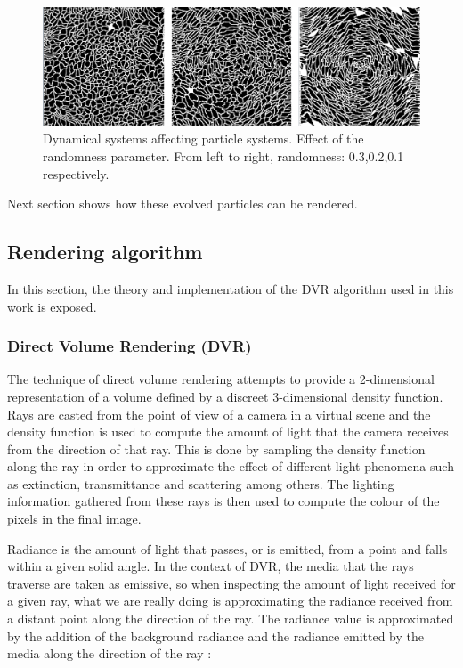 \documentclass[oneside,a4paper,english,links]{amca}
\begin{document}
\begin{figure}[htb!]
  \centerline{\includegraphics[scale=0.21]{fig4}}
  \caption{Dynamical systems affecting particle systems. Effect of the randomness parameter. From left to right, randomness: 0.3,0.2,0.1 respectively. }
  \label{fg:fig4}
\end{figure}

Next section shows how these evolved particles can be rendered.



\subsection{Rendering algorithm}

In this section, the theory and implementation of the DVR algorithm used in this work is exposed.

\subsubsection{Direct Volume Rendering (DVR)}

The technique of direct volume rendering attempts to provide a
2-dimensional representation of a volume defined by a discreet
3-dimensional density function. Rays are casted from the point of view
of a camera in a virtual scene and the density function is used to
compute the amount of light that the camera receives from the
direction of that ray. This is done by sampling the density function
along the ray in order to approximate the effect of different light
phenomena such as extinction, transmittance and scattering among
others. The lighting information gathered from these rays is then
used to compute the colour of the pixels in the final image.

Radiance is the amount of light that passes, or is emitted, from a
point and falls within a given solid angle. In the context of DVR, the
media that the rays traverse are taken as emissive, so when inspecting
the amount of light received for a given ray, what we are really doing
is approximating the radiance received from a distant point along the
direction of the ray. The radiance value is approximated by the
addition of the background radiance and the radiance emitted by the
media along the direction of the ray \citep{Kratz2006} : 
\end{document}
